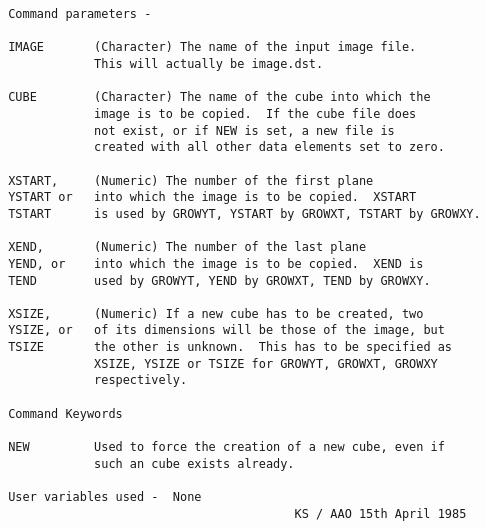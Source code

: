 \begin{description}
\begin{verbatim}
 Command parameters -

 IMAGE       (Character) The name of the input image file.
             This will actually be image.dst.

 CUBE        (Character) The name of the cube into which the
             image is to be copied.  If the cube file does
             not exist, or if NEW is set, a new file is
             created with all other data elements set to zero.

 XSTART,     (Numeric) The number of the first plane
 YSTART or   into which the image is to be copied.  XSTART
 TSTART      is used by GROWYT, YSTART by GROWXT, TSTART by GROWXY.

 XEND,       (Numeric) The number of the last plane
 YEND, or    into which the image is to be copied.  XEND is
 TEND        used by GROWYT, YEND by GROWXT, TEND by GROWXY.

 XSIZE,      (Numeric) If a new cube has to be created, two
 YSIZE, or   of its dimensions will be those of the image, but
 TSIZE       the other is unknown.  This has to be specified as
             XSIZE, YSIZE or TSIZE for GROWYT, GROWXT, GROWXY
             respectively.

 Command Keywords

 NEW         Used to force the creation of a new cube, even if
             such an cube exists already.

 User variables used -  None
                                         KS / AAO 15th April 1985
\end{verbatim}
\end{description}
